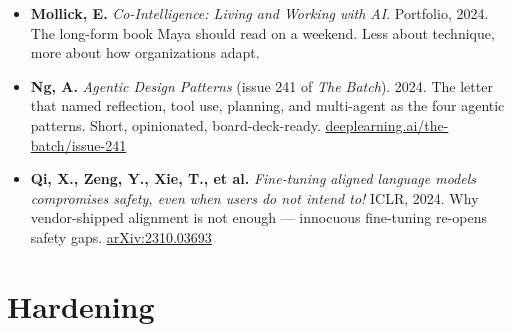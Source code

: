 \begin{itemize}
\item \textbf{Mollick, E.} \textit{Co-Intelligence: Living and Working with AI}. Portfolio, 2024. The long-form book Maya should read on a weekend. Less about technique, more about how organizations adapt.

\item \textbf{Ng, A.} \textit{Agentic Design Patterns} (issue 241 of \textit{The Batch}). 2024. The letter that named reflection, tool use, planning, and multi-agent as the four agentic patterns. Short, opinionated, board-deck-ready. \href{https://www.deeplearning.ai/the-batch/issue-241/}{deeplearning.ai/the-batch/issue-241}

\item \textbf{Qi, X., Zeng, Y., Xie, T., et al.} \textit{Fine-tuning aligned language models compromises safety, even when users do not intend to!} ICLR, 2024. Why vendor-shipped alignment is not enough --- innocuous fine-tuning re-opens safety gaps. \href{https://arxiv.org/abs/2310.03693}{arXiv:2310.03693}
\end{itemize}

\section{Hardening}

